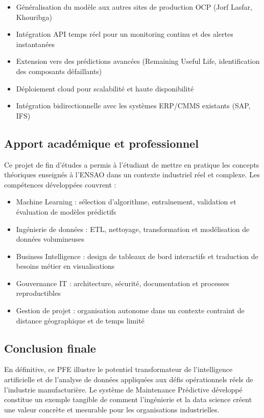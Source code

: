 \documentclass[a4paper,12pt,twoside]{report}
\begin{document}
\begin{itemize}
    \item Généralisation du modèle aux autres sites de production OCP (Jorf Lasfar, Khouribga)
    \item Intégration API temps réel pour un monitoring continu et des alertes instantanées
    \item Extension vers des prédictions avancées (Remaining Useful Life, identification des composants défaillants)
    \item Déploiement cloud pour scalabilité et haute disponibilité
    \item Intégration bidirectionnelle avec les systèmes ERP/CMMS existants (SAP, IFS)
\end{itemize}

\subsection{Apport académique et professionnel}

Ce projet de fin d'études a permis à l'étudiant de mettre en pratique les concepts théoriques enseignés à l'ENSAO dans un contexte industriel réel et complexe. Les compétences développées couvrent :

\begin{itemize}
    \item Machine Learning : sélection d'algorithme, entraînement, validation et évaluation de modèles prédictifs
    \item Ingénierie de données : ETL, nettoyage, transformation et modélisation de données volumineuses
    \item Business Intelligence : design de tableaux de bord interactifs et traduction de besoins métier en visualisations
    \item Gouvernance IT : architecture, sécurité, documentation et processes reproductibles
    \item Gestion de projet : organisation autonome dans un contexte contraint de distance géographique et de temps limité
\end{itemize}

\subsection{Conclusion finale}

En définitive, ce PFE illustre le potentiel transformateur de l'intelligence artificielle et de l'analyse de données appliquées aux défis opérationnels réels de l'industrie manufacturière. Le système de Maintenance Prédictive développé constitue un exemple tangible de comment l'ingénierie et la data science créent une valeur concrète et mesurable pour les organisations industrielles.
\end{document}
